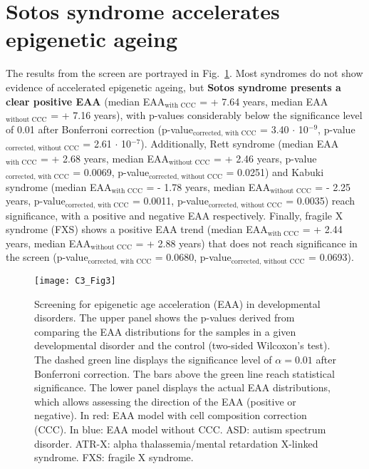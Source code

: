 \section{Sotos syndrome accelerates epigenetic ageing}

\smallskip

The results from the screen are portrayed in Fig.~\ref{fig:c3_fig3}. Most syndromes do not show evidence of accelerated epigenetic ageing, but \textbf{Sotos syndrome presents a clear positive EAA} (median EAA$_{\text{with CCC}}$ = + 7.64 years, median EAA$_{\text{without CCC}}$ = + 7.16 years), with p-values considerably below the significance level of 0.01 after Bonferroni correction (p-value$_{\text{corrected, with CCC}}$ = 3.40 $\cdot$ 10$^{-9}$, p-value$_{\text{corrected, without CCC}}$ = 2.61 $\cdot$ 10$^{-7}$). Additionally, Rett syndrome (median EAA$_{\text{with CCC}}$ = + 2.68 years, median EAA$_{\text{without CCC}}$ = + 2.46 years, p-value$_{\text{corrected, with CCC}}$ = 0.0069, p-value$_{\text{corrected, without CCC}}$ = 0.0251) and Kabuki syndrome (median EAA$_{\text{with CCC}}$ = - 1.78 years, median EAA$_{\text{without CCC}}$ = - 2.25 years, p-value$_{\text{corrected, with CCC}}$ = 0.0011, p-value$_{\text{corrected, without CCC}}$ = 0.0035) reach significance, with a positive and negative EAA respectively. Finally, fragile X syndrome (FXS) shows a positive EAA trend (median EAA$_{\text{with CCC}}$ = + 2.44 years, median EAA$_{\text{without CCC}}$ = + 2.88 years) that does not reach significance in the screen (p-value$_{\text{corrected, with CCC}}$ = 0.0680, p-value$_{\text{corrected, without CCC}}$ = 0.0693).

\bigskip

\begin{figure}[htbp!] 
	\centering    
	\texttt{[image: C3\_Fig3]}
	\caption[Screening for epigenetic age acceleration (EAA) in developmental disorders]{Screening for epigenetic age acceleration (EAA) in developmental disorders. The upper panel shows the p-values derived from comparing the EAA distributions for the samples in a given developmental disorder and the control (two-sided Wilcoxon’s test). The dashed green line displays the significance level of $\alpha = 0.01$ after Bonferroni correction. The bars above the green line reach statistical significance. The lower panel displays the actual EAA distributions, which allows assessing the direction of the EAA (positive or negative). In red: EAA model with cell composition correction (CCC). In blue: EAA model without CCC. ASD: autism spectrum disorder. ATR-X: alpha thalassemia/mental retardation X-linked syndrome. FXS: fragile X syndrome.}
	\label{fig:c3_fig3}
\end{figure}

